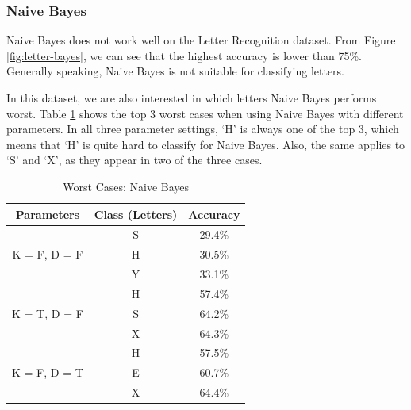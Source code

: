 \documentclass[11pt]{article}
\begin{document}
\subsubsection{Naive Bayes}
Naive Bayes does not work well on the Letter Recognition dataset. From Figure \ref{fig:letter-bayes}, we can see that the highest accuracy is lower than 75\%. Generally speaking, Naive Bayes is not suitable for classifying letters.

In this dataset, we are also interested in which letters Naive Bayes performs worst. Table \ref{tbl:bayes} shows the top 3 worst cases when using Naive Bayes with different parameters. In all three parameter settings, `H' is always one of the top 3, which means that `H' is quite hard to classify for Naive Bayes. Also, the same applies to `S' and `X', as they appear in two of the three cases.



\begin{table}[!htb]

\centering
\begin{tabular}{c  c  c} \hline

Parameters & Class (Letters) & Accuracy \\\hline
\multirow{3}{*}{K = F, D = F} & S & 29.4\% \\
	& H & 30.5\% \\
	& Y & 33.1\% \\\hline
\multirow{3}{*}{K = T, D = F} & H & 57.4\% \\
	& S & 64.2\% \\
	& X & 64.3\% \\\hline
\multirow{3}{*}{K = F, D = T} & H & 57.5\% \\
	& E & 60.7\% \\
	& X & 64.4\% \\\hline
\end{tabular}
\caption{Worst Cases: Naive Bayes} %
\label{tbl:bayes}
\end{table}
\end{document}
